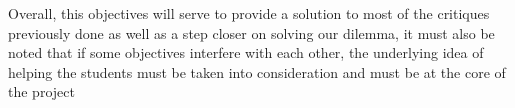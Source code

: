Overall, this objectives will serve to provide a solution to most of the critiques previously done as well as a step closer on solving our dilemma, it must also be noted that if some objectives interfere with each other, the underlying idea of helping the students must be taken into consideration and must be at the core of the project
